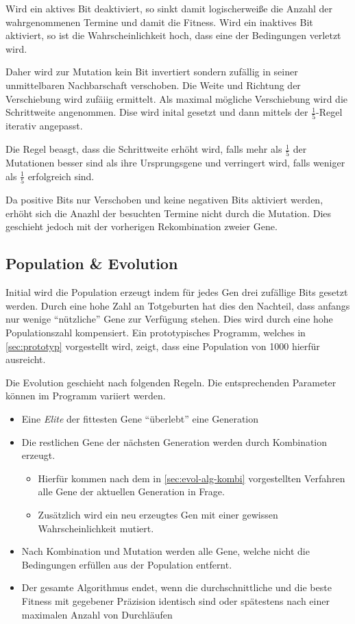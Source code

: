 Wird ein aktives Bit deaktiviert, so sinkt damit logischerweiße die Anzahl der wahrgenommenen Termine und damit die Fitness.
Wird ein inaktives Bit aktiviert, so ist die Wahrscheinlichkeit hoch, dass eine der Bedingungen verletzt wird.

Daher wird zur Mutation kein Bit invertiert sondern zufällig in seiner unmittelbaren Nachbarschaft verschoben.
Die Weite und Richtung der Verschiebung wird zufäiig ermittelt. Als maximal mögliche Verschiebung wird die Schrittweite angenommen.
Dise wird inital gesetzt und dann mittels der $\frac{1}{5}$-Regel iterativ angepasst.

Die Regel beasgt, dass die Schrittweite erhöht wird, falls mehr als $\frac{1}{5}$ der Mutationen besser sind als ihre Ursprungsgene
und verringert wird, falls weniger als $\frac{1}{5}$ erfolgreich sind.

Da positive Bits nur Verschoben und keine negativen Bits aktiviert werden,
erhöht sich die Anazhl der besuchten Termine nicht durch die Mutation.
Dies geschieht jedoch mit der vorherigen Rekombination zweier Gene.

\subsection{Population \& Evolution}
Initial wird die Population erzeugt indem für jedes Gen drei zufällige Bits gesetzt werden.
Durch eine hohe Zahl an Totgeburten hat dies den Nachteil,
dass anfangs nur wenige \enquote{nützliche} Gene zur Verfügung stehen.
Dies wird durch eine hohe Populationszahl kompensiert.
Ein prototypisches Programm, welches in \autoref{sec:prototyp} vorgestellt wird,
zeigt, dass eine Population von 1000 hierfür ausreicht.

Die Evolution geschieht nach folgenden Regeln.
Die entsprechenden Parameter können im Programm variiert werden.
\begin{itemize}
    \item Eine \emph{Elite} der fittesten Gene \enquote{überlebt} eine Generation
    \item Die restlichen Gene der nächsten Generation werden durch Kombination erzeugt.
    \begin{itemize}
        \item Hierfür kommen nach dem in \autoref{sec:evol-alg-kombi} vorgestellten Verfahren alle Gene der aktuellen Generation in Frage.
        \item Zusätzlich wird ein neu erzeugtes Gen mit einer gewissen Wahrscheinlichkeit mutiert.
    \end{itemize}
    \item Nach Kombination und Mutation werden alle Gene, welche nicht die Bedingungen erfüllen aus der Population entfernt.
    \item Der gesamte Algorithmus endet, wenn die durchschnittliche und die beste Fitness mit gegebener Präzision identisch sind oder spätestens nach einer maximalen Anzahl von Durchläufen
\end{itemize}